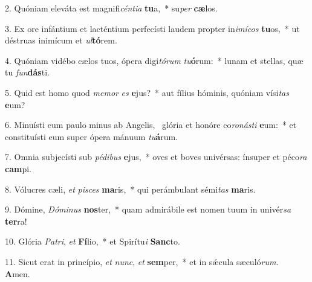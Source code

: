 2. Quóniam eleváta est magnifi\textit{cén}\textit{ti}\textit{a} \textbf{tu}a,~*  su\textit{per} \textbf{cæ}los.\

3. Ex ore infántium et lacténtium perfecísti laudem propter in\textit{i}\textit{mí}\textit{cos} \textbf{tu}os,~*  ut déstruas inimícum et \textit{ul}\textbf{tó}rem.\

4. Quóniam vidébo cælos tuos, ópera digi\textit{tó}\textit{rum} \textit{tu}\textbf{ó}rum:~*  lunam et stellas, quæ tu \textit{fun}\textbf{dás}ti.\

5. Quid est homo quod \textit{me}\textit{mor} \textit{es} \textbf{e}jus?~*  aut fílius hóminis, quóniam vísi\textit{tas} \textbf{e}um?\

6. Minuísti eum paulo minus ab Angelis, \dag\  glória et honóre co\textit{ro}\textit{nás}\textit{ti} \textbf{e}um:~*  et constituísti eum super ópera mánuum \textit{tu}\textbf{á}rum.\

7. Omnia subjecísti sub \textit{pé}\textit{di}\textit{bus} \textbf{e}jus,~*  oves et boves univérsas: ínsuper et péco\textit{ra} \textbf{cam}pi.\

8. Vólucres cæli, \textit{et} \textit{pi}\textit{sces} \textbf{ma}ris,~*  qui perámbulant sémi\textit{tas} \textbf{ma}ris.\

9. Dómine, \textit{Dó}\textit{mi}\textit{nus} \textbf{nos}ter,~*  quam admirábile est nomen tuum in univér\textit{sa} \textbf{ter}ra!\

10. Glória \textit{Pa}\textit{tri}, \textit{et} \textbf{Fí}lio,~*  et Spirítu\textit{i} \textbf{Sanc}to.\

11. Sicut erat in princípio, \textit{et} \textit{nunc}, \textit{et} \textbf{sem}per,~*  et in sǽcula sæculó\textit{rum}. \textbf{A}men.\

